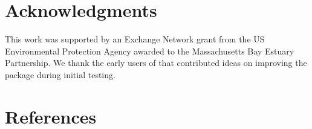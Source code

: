 \hypertarget{acknowledgments}{%
\section{Acknowledgments}\label{acknowledgments}}

This work was supported by an Exchange Network grant from the US Environmental Protection Agency awarded to the Massachusetts Bay Estuary Partnership. We thank the early users of  that contributed ideas on improving the package during initial testing.

\hypertarget{references}{%
\section*{References}\label{references}}

